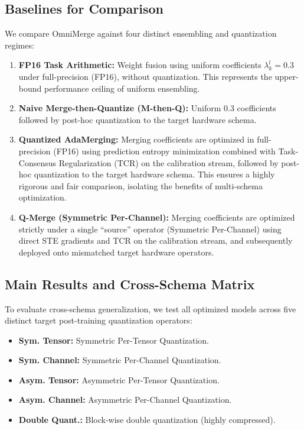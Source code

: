 \subsection{Baselines for Comparison}
We compare OmniMerge against four distinct ensembling and quantization regimes:
\begin{enumerate}
    \item \textbf{FP16 Task Arithmetic:} Weight fusion using uniform coefficients $\lambda^l_k = 0.3$ under full-precision (FP16), without quantization. This represents the upper-bound performance ceiling of uniform ensembling.
    \item \textbf{Naive Merge-then-Quantize (M-then-Q):} Uniform $0.3$ coefficients followed by post-hoc quantization to the target hardware schema.
    \item \textbf{Quantized AdaMerging:} Merging coefficients are optimized in full-precision (FP16) using prediction entropy minimization combined with Task-Consensus Regularization (TCR) on the calibration stream, followed by post-hoc quantization to the target hardware schema. This ensures a highly rigorous and fair comparison, isolating the benefits of multi-schema optimization.
    \item \textbf{Q-Merge (Symmetric Per-Channel):} Merging coefficients are optimized strictly under a single ``source'' operator (Symmetric Per-Channel) using direct STE gradients and TCR on the calibration stream, and subsequently deployed onto mismatched target hardware operators.
\end{enumerate}

\subsection{Main Results and Cross-Schema Matrix}
To evaluate cross-schema generalization, we test all optimized models across five distinct target post-training quantization operators:
\begin{itemize}
    \item \textbf{Sym. Tensor:} Symmetric Per-Tensor Quantization.
    \item \textbf{Sym. Channel:} Symmetric Per-Channel Quantization.
    \item \textbf{Asym. Tensor:} Asymmetric Per-Tensor Quantization.
    \item \textbf{Asym. Channel:} Asymmetric Per-Channel Quantization.
    \item \textbf{Double Quant.:} Block-wise double quantization (highly compressed).
\end{itemize}

